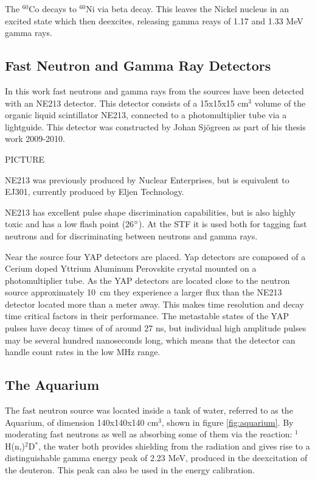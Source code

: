 \documentclass[main.tex]{subfiles}
\begin{document}
The $^\text{60}\text{Co}$ decays to $^\text{60}\text{Ni}$ via beta decay. This leaves the Nickel nucleus in an excited state which then deexcites, releasing gamma reays of 1.17 and 1.33 MeV gamma rays\cite{Nudat}.

\subsection{Fast Neutron and Gamma Ray Detectors}
In this work fast neutrons and gamma rays from the sources have been detected with an NE213 detector. This detector consists of a 15x15x15 \si{\cm}$^\text{3}$ volume of the organic liquid scintillator NE213, connected to a photomultiplier tube via a lightguide. This detector was constructed by Johan Sjögreen as part of his thesis work 2009-2010\cite{sjogren}.

PICTURE

NE213 was previously produced by Nuclear Enterprises, but is equivalent to EJ301, currently produced by Eljen Technology. 

NE213 has excellent pulse shape discrimination capabilities, but is also highly toxic and has a low flash point (26$\text{\degree}$). At the STF it is used both for tagging fast neutrons and for discriminating between neutrons and gamma rays. 

Near the source four YAP detectors are placed. Yap detectors are composed of a Cerium doped Yttrium Aluminum Perovskite crystal mounted on a photomultiplier tube. As the YAP detectors are located close to the neutron source approximately \si{10\cm} they experience a larger flux than the NE213 detector located more than a meter away. This makes time resolution and decay time critical factors in their performance. The metastable states of the YAP pulses have decay times of of around 27 ns, but individual high amplitude pulses may be several hundred nanoseconds long, which means that the detector can handle count rates in the low MHz range.

\subsection{The Aquarium}
The fast neutron source was located inside a tank of water, referred to as the Aquarium, of dimension 140x140x140 \si{\cm}${}^\text{3}$, shown in figure \ref{fig:aquarium}. By moderating fast neutrons as well as absorbing some of them via the reaction: $^{\text{1}}$H(n,\textgamma)$^{\text{2}}$D$^*$, the water both provides shielding from the radiation and gives rise to a distinguishable gamma energy peak of 2.23 MeV, produced in the deexcitation of the deuteron. This peak can also be used in the energy calibration.
\end{document}
